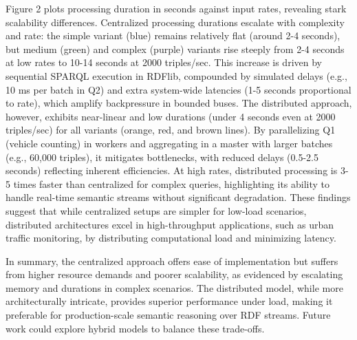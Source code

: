 \documentclass[5p,times]{elsarticle}
\begin{document}
    Figure 2 plots processing duration in seconds against input rates, revealing stark scalability differences. Centralized processing durations escalate with complexity and rate: the simple variant (blue) remains relatively flat (around 2-4 seconds), but medium (green) and complex (purple) variants rise steeply from 2-4 seconds at low rates to 10-14 seconds at 2000 triples/sec. This increase is driven by sequential SPARQL execution in RDFlib, compounded by simulated delays (e.g., 10 ms per batch in Q2) and extra system-wide latencies (1-5 seconds proportional to rate), which amplify backpressure in bounded buses.
    The distributed approach, however, exhibits near-linear and low durations (under 4 seconds even at 2000 triples/sec) for all variants (orange, red, and brown lines). By parallelizing Q1 (vehicle counting) in workers and aggregating in a master with larger batches (e.g., 60,000 triples), it mitigates bottlenecks, with reduced delays (0.5-2.5 seconds) reflecting inherent efficiencies. At high rates, distributed processing is 3-5 times faster than centralized for complex queries, highlighting its ability to handle real-time semantic streams without significant degradation. These findings suggest that while centralized setups are simpler for low-load scenarios, distributed architectures excel in high-throughput applications, such as urban traffic monitoring, by distributing computational load and minimizing latency.


In summary, the centralized approach offers ease of implementation but suffers from higher resource demands and poorer scalability, as evidenced by escalating memory and durations in complex scenarios. The distributed model, while more architecturally intricate, provides superior performance under load, making it preferable for production-scale semantic reasoning over RDF streams. Future work could explore hybrid models to balance these trade-offs.





\end{document}
